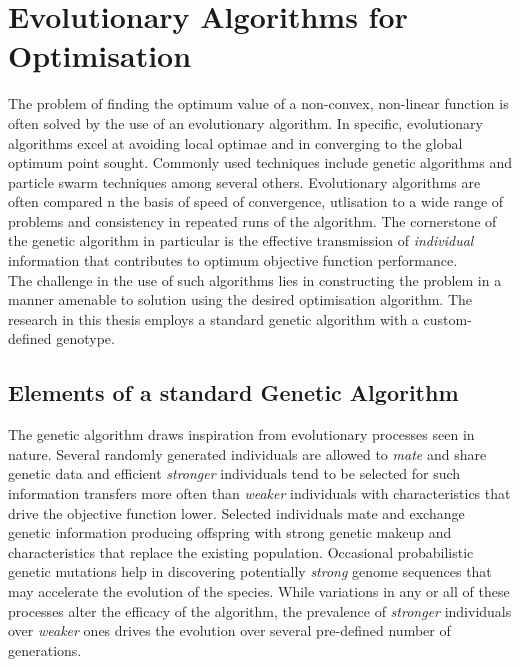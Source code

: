 \documentclass[ExampleMasters.tex]{subfiles}
\begin{document}
	\chapter{Evolutionary Algorithms for Optimisation}
	The problem of finding the optimum value of a non-convex, non-linear function is often solved by the use of an evolutionary algorithm. In specific, evolutionary algorithms excel at avoiding local optimae and in converging to the global optimum point sought. Commonly used techniques include genetic algorithms and particle swarm techniques among several others. Evolutionary algorithms are often compared n the basis of speed of convergence, utlisation to a wide range of problems and consistency in repeated runs of the algorithm. The cornerstone of the genetic algorithm in particular is the effective transmission of \textit{individual} information that contributes to optimum objective function performance.\\

	The challenge in the use of such algorithms lies in constructing the problem in a manner amenable to solution using the desired optimisation algorithm. The research in this thesis employs a standard genetic algorithm with a custom-defined genotype.\\

	\section{Elements of a standard Genetic Algorithm}
		The genetic algorithm draws inspiration from evolutionary processes seen in nature. Several randomly generated individuals are allowed to \textit{mate} and share genetic data and efficient \textit{stronger} individuals tend to be selected for such information transfers more often than \textit{weaker} individuals with characteristics that drive the objective function lower. Selected individuals mate and exchange genetic information producing offspring with strong genetic makeup and characteristics that replace the existing population. Occasional probabilistic genetic mutations help in discovering potentially \textit{strong} genome sequences that may accelerate the evolution of the species. While variations in any or all of these processes alter the efficacy of the algorithm, the prevalence of \textit{stronger} individuals over \textit{weaker} ones drives the evolution over several pre-defined number of generations.\\
\end{document}
